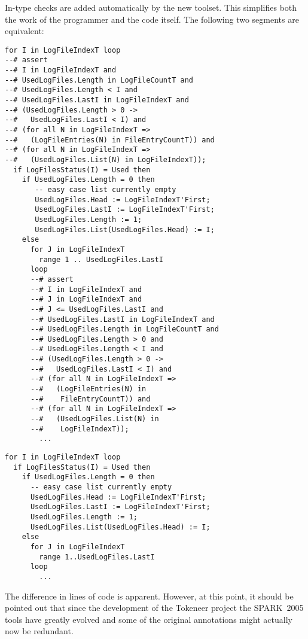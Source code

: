 \documentclass[10pt,a4paper,twocolumn]{article}
\newcommand{\oldspark}{SPARK~2005\xspace}
\newcommand{\newspark}{SPARK~2014\xspace}
\begin{document}
In-type checks are added automatically by the new toolset. This
simplifies both the work of the programmer and the code
itself. The following two segments are equivalent:

\begin{lstlisting}[caption=\oldspark]
for I in LogFileIndexT loop
--# assert
--# I in LogFileIndexT and
--# UsedLogFiles.Length in LogFileCountT and
--# UsedLogFiles.Length < I and
--# UsedLogFiles.LastI in LogFileIndexT and
--# (UsedLogFiles.Length > 0 ->
--#   UsedLogFiles.LastI < I) and
--# (for all N in LogFileIndexT =>
--#   (LogFileEntries(N) in FileEntryCountT)) and
--# (for all N in LogFileIndexT =>
--#   (UsedLogFiles.List(N) in LogFileIndexT));
  if LogFilesStatus(I) = Used then
    if UsedLogFiles.Length = 0 then
       -- easy case list currently empty
       UsedLogFiles.Head := LogFileIndexT'First;
       UsedLogFiles.LastI := LogFileIndexT'First;
       UsedLogFiles.Length := 1;
       UsedLogFiles.List(UsedLogFiles.Head) := I;
    else
      for J in LogFileIndexT
        range 1 .. UsedLogFiles.LastI
      loop
      --# assert
      --# I in LogFileIndexT and
      --# J in LogFileIndexT and
      --# J <= UsedLogFiles.LastI and
      --# UsedLogFiles.LastI in LogFileIndexT and
      --# UsedLogFiles.Length in LogFileCountT and
      --# UsedLogFiles.Length > 0 and
      --# UsedLogFiles.Length < I and
      --# (UsedLogFiles.Length > 0 ->
      --#   UsedLogFiles.LastI < I) and
      --# (for all N in LogFileIndexT =>
      --#   (LogFileEntries(N) in
      --#    FileEntryCountT)) and
      --# (for all N in LogFileIndexT =>
      --#   (UsedLogFiles.List(N) in
      --#    LogFileIndexT));
        ...
\end{lstlisting}

\begin{lstlisting}[caption=\newspark]
for I in LogFileIndexT loop
  if LogFilesStatus(I) = Used then
    if UsedLogFiles.Length = 0 then
      -- easy case list currently empty
      UsedLogFiles.Head := LogFileIndexT'First;
      UsedLogFiles.LastI := LogFileIndexT'First;
      UsedLogFiles.Length := 1;
      UsedLogFiles.List(UsedLogFiles.Head) := I;
    else
      for J in LogFileIndexT
        range 1..UsedLogFiles.LastI
      loop
        ...
\end{lstlisting}
The difference in lines of code is apparent. However, at this point,
it should be pointed out that since the development of the Tokeneer
project the \oldspark tools have greatly evolved and some of the
original annotations might actually now be redundant.
\end{document}
